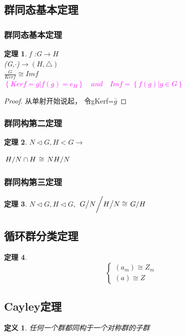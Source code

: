 \documentclass{report}
\newtheorem{theorem}{定理}[section]
\newtheorem{proof}{证明}[section]
\newtheorem{definition}{定义}
\begin{document}
\subsection{群同态基本定理}
\subsubsection{群同态基本定理}
\begin{theorem}
\noindent f :G$\rightarrow H$
\\(G,$\cdot$)$\rightarrow(H,\triangle)$
\\$\frac{G}{Kerf}\cong Imf$
\\\textcolor{magenta}{$\left\{Kerf=g|f(g)=e_{H}\right\} \quad and \quad Imf=\left\{f(g)|g \in G \right\}$}
\end{theorem}
\begin{proof}
	从单射开始说起，
	令gKerf=$\bar{g}$
		\end{proof}
		\subsubsection{群同构第二定理}
		\begin{theorem}
		$N \triangleleft G,H < G
		 \rightarrow  $
		
			$\left. H \middle/ N \cap H \right.\cong \left. NH \middle/ N 
	\right.$
		\end{theorem}
		
		\subsubsection{群同构第三定理}
		\begin{theorem}
			$N \triangleleft G,H \triangleleft G,$
			$G \big/ N \bigg/ H \big/  N  \cong \left. G \middle/ H
	\right.$
		\end{theorem}
\subsection{循环群分类定理}
\begin{theorem}
$$ \left\{
\begin{aligned}
(a_{m}) \cong Z_{m} 
\\
(a)\cong Z
\end{aligned}
\right.
$$
\end{theorem}
\subsection{Cayley定理}
\begin{definition}
任何一个群都同构于一个对称群的子群
\end{definition}
\end{document}
